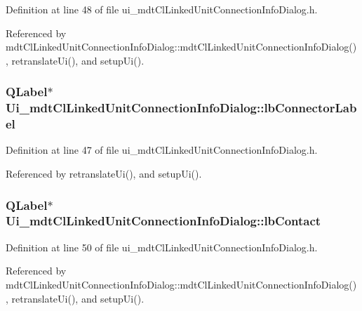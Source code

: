 Definition at line 48 of file ui\-\_\-mdt\-Cl\-Linked\-Unit\-Connection\-Info\-Dialog.\-h.



Referenced by mdt\-Cl\-Linked\-Unit\-Connection\-Info\-Dialog\-::mdt\-Cl\-Linked\-Unit\-Connection\-Info\-Dialog(), retranslate\-Ui(), and setup\-Ui().

\hypertarget{class_ui__mdt_cl_linked_unit_connection_info_dialog_ae35ea29ffdf97d86d7f0c1598cc24120}{
\subsubsection[{lb\-Connector\-Label}]{\setlength{\rightskip}{0pt plus 5cm}Q\-Label$\ast$ Ui\-\_\-mdt\-Cl\-Linked\-Unit\-Connection\-Info\-Dialog\-::lb\-Connector\-Label}}\label{class_ui__mdt_cl_linked_unit_connection_info_dialog_ae35ea29ffdf97d86d7f0c1598cc24120}


Definition at line 47 of file ui\-\_\-mdt\-Cl\-Linked\-Unit\-Connection\-Info\-Dialog.\-h.



Referenced by retranslate\-Ui(), and setup\-Ui().

\hypertarget{class_ui__mdt_cl_linked_unit_connection_info_dialog_ad5fb295a95cbf24db4940e8042c9ccdf}{
\subsubsection[{lb\-Contact}]{\setlength{\rightskip}{0pt plus 5cm}Q\-Label$\ast$ Ui\-\_\-mdt\-Cl\-Linked\-Unit\-Connection\-Info\-Dialog\-::lb\-Contact}}\label{class_ui__mdt_cl_linked_unit_connection_info_dialog_ad5fb295a95cbf24db4940e8042c9ccdf}


Definition at line 50 of file ui\-\_\-mdt\-Cl\-Linked\-Unit\-Connection\-Info\-Dialog.\-h.



Referenced by mdt\-Cl\-Linked\-Unit\-Connection\-Info\-Dialog\-::mdt\-Cl\-Linked\-Unit\-Connection\-Info\-Dialog(), retranslate\-Ui(), and setup\-Ui().

